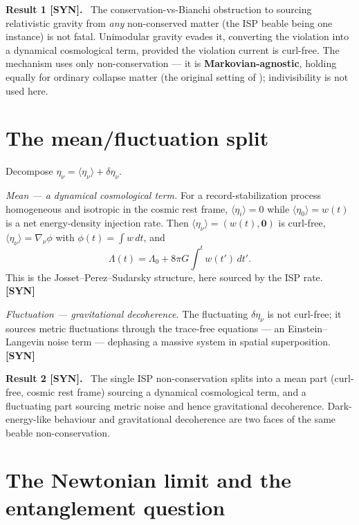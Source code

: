 \documentclass[aps,prd,preprint,amsmath,amssymb,nofootinbib,superscriptaddress]{revtex4-2}
\newenvironment{result}[1]{\par\medskip\noindent\textbf{#1}\ }{\par\medskip}
\begin{document}
\begin{result}{Result 1 [SYN].}
The conservation-vs-Bianchi obstruction to sourcing relativistic gravity from \emph{any}
non-conserved matter (the ISP beable being one instance) is not fatal. Unimodular gravity
evades it, converting the violation into a dynamical cosmological term, provided the violation
current is curl-free. The mechanism uses only non-conservation --- it is \textbf{Markovian-agnostic},
holding equally for ordinary collapse matter (the original setting of \cite{Josset2017});
indivisibility is not used here.
\end{result}

\section{The mean/fluctuation split}

Decompose $\eta_\nu=\langle\eta_\nu\rangle+\delta\eta_\nu$.

\emph{Mean --- a dynamical cosmological term.} For a record-stabilization process
homogeneous and isotropic in the cosmic rest frame, $\langle\eta_i\rangle=0$ while
$\langle\eta_0\rangle=w(t)$ is a net energy-density injection rate. Then
$\langle\eta_\nu\rangle=(w(t),\mathbf0)$ is curl-free, $\langle\eta_\nu\rangle=\nabla_\nu\phi$
with $\phi(t)=\int w\,dt$, and
\begin{equation}
\Lambda(t)=\Lambda_0+8\pi G\int^t w(t')\,dt' .
\end{equation}
This is the Josset--Perez--Sudarsky structure, here sourced by the ISP rate. \textbf{[SYN]}

\emph{Fluctuation --- gravitational decoherence.} The fluctuating $\delta\eta_\nu$ is not
curl-free; it sources metric fluctuations through the trace-free equations --- an
Einstein--Langevin noise term \cite{HuVerdaguer2008} --- dephasing a massive system in
spatial superposition. \textbf{[SYN]}

\begin{result}{Result 2 [SYN].}
The single ISP non-conservation splits into a mean part (curl-free, cosmic rest frame)
sourcing a dynamical cosmological term, and a fluctuating part sourcing metric noise and
hence gravitational decoherence. Dark-energy-like behaviour and gravitational decoherence
are two faces of the same beable non-conservation.
\end{result}

\section{The Newtonian limit and the entanglement question}
\end{document}
